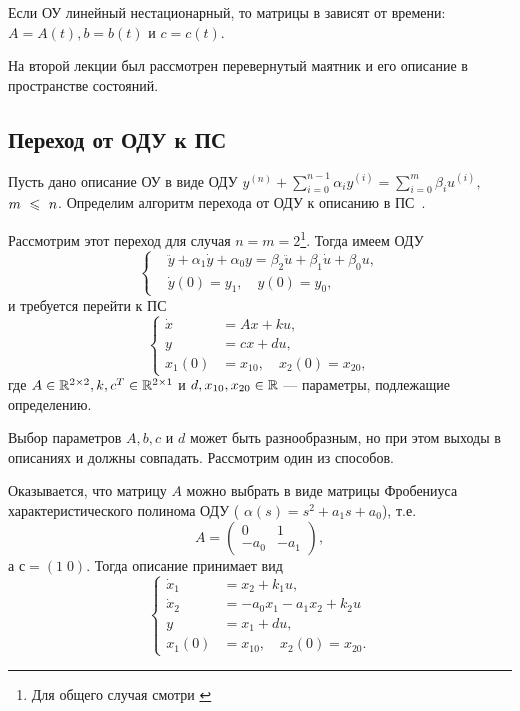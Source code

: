 \documentclass[../../TAU.tex]{subfiles}
\begin{document}
    Если ОУ линейный нестационарный, то матрицы в  зависят от времени: $A=A(t), b=b(t)$ и $c=c(t)$.

    На второй лекции был рассмотрен перевернутый маятник и его описание в пространстве состояний.

\subsection{Переход от ОДУ к ПС}

    Пусть дано описание ОУ в виде ОДУ  {}
    $y^{(n)}+\sum_{i=0}^{n-1}\alpha_iy^{(i)}=\sum_{i=0}^{m}\beta_iu^{(i)},\;$ $m~\leqslant~n$. 
    Определим алгоритм перехода от ОДУ к описанию в ПС~.

    Рассмотрим этот переход для случая $n=m=2$\footnote{Для общего случая смотри \cite{pandia}}. Тогда имеем ОДУ
    \begin{equation}\label{ODU_2}
        \left\{
        \begin{aligned}
            &\ddot y + \alpha_1 \dot y + \alpha_0 y = \beta_2 \ddot{u} + \beta_1 \dot u + \beta_0 u,\\
            &\dot y(0) = y_1,\quad y(0) = y_0,
        \end{aligned}\right.
    \end{equation}
        и требуется перейти к ПС
    \begin{equation}\label{STDS_2}
        \left\{
        \begin{aligned}
            \dot x &= Ax + ku,\\
            y &= cx + du,\\
            x_1(0) &= x_{10},\quad x_2(0) = x_{20},
        \end{aligned}
        \right.
    \end{equation}
    где 
    $A\in\mathbb{R}^{2\times2}, k, c^T\in\mathbb{R}^{2\times1}$ 
    и 
    $d,x_{10}, x_{20}\in\mathbb{R}$ --- 
    параметры, подлежащие определению.

    Выбор параметров $A,b,c$ и $d$ может быть разнообразным, но при этом выходы в описаниях  и  должны совпадать. Рассмотрим один из способов.

    Оказывается, что матрицу $A$ можно выбрать в виде матрицы Фробениуса характеристического полинома ОДУ  (
    $\alpha(s) = s^2+a_1s+a_0$), 
    т.е.
    $$
        A =
        \begin{pmatrix}
            0&    1\\
            -a_0& -a_1
        \end{pmatrix},
    $$
    а $с = (1\; 0)$. Тогда описание  принимает вид
    \begin{equation}\label{EQ1}
        \left\{
        \begin{aligned}
            \dot x_1 &= x_2 + k_1 u,\\
            \dot x_2 &= -a_0x_1-a_1x_2+k_2u\\
            y &= x_1 + du,\\
            x_1(0) &= x_{10},\quad x_2(0) = x_{20}.
        \end{aligned}
        \right.
    \end{equation}
\end{document}
